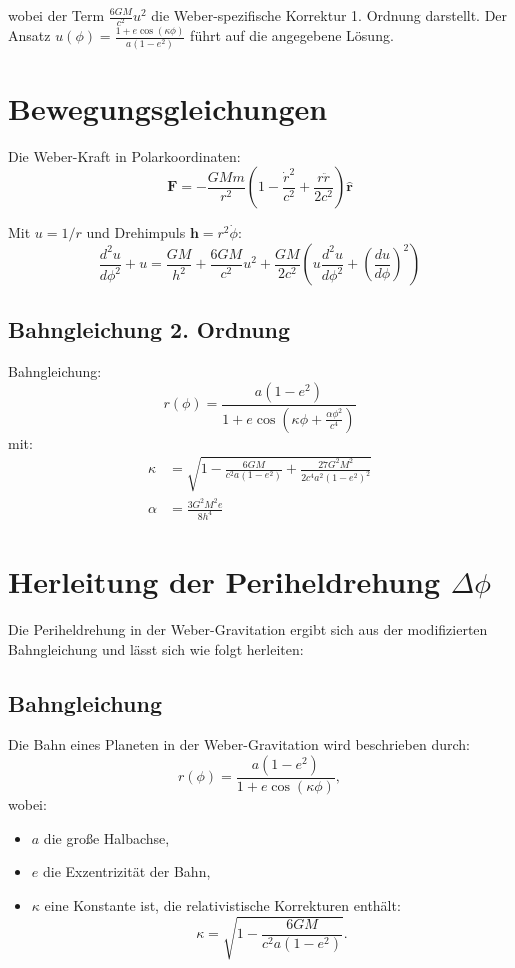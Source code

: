 wobei der Term \(\frac{6GM}{c^2} u^2\) die Weber-spezifische Korrektur 1. Ordnung darstellt. Der Ansatz \(u(\phi) = \frac{1 + e \cos(\kappa\phi)}{a(1 - e^2)}\) führt auf die angegebene Lösung.

\section{Bewegungsgleichungen}
Die Weber-Kraft in Polarkoordinaten:
\begin{equation}
\mathbf{F} = -\frac{GMm}{r^2}\left(1 - \frac{\dot{r}^2}{c^2} + \frac{r\ddot{r}}{2c^2}\right)\mathbf{\hat{r}}
\end{equation}

Mit $u=1/r$ und Drehimpuls $\mathbf{h}=r^2\dot{\phi}$:
\begin{equation}
\frac{d^2u}{d\phi^2} + u = \frac{GM}{h^2} + \frac{6GM}{c^2}u^2 + \frac{GM}{2c^2}\left(u\frac{d^2u}{d\phi^2} + \left(\frac{du}{d\phi}\right)^2\right)
\end{equation}

\subsection{Bahngleichung 2. Ordnung}
Bahngleichung:
\begin{equation}
\boxed
{
    r(\phi) = \frac{a(1-e^2)}{1 + e\cos\left(\kappa\phi + \frac{\alpha\phi^2}{c^4}\right)}
}
\end{equation}
mit:
\begin{align}
\kappa &= \sqrt{1 - \frac{6GM}{c^2a(1-e^2)} + \frac{27G^2M^2}{2c^4a^2(1-e^2)^2}}\\
\alpha &= \frac{3G^2M^2e}{8h^4}
\end{align}

\section{Herleitung der Periheldrehung $\Delta\phi$}

Die Periheldrehung in der Weber-Gravitation ergibt sich aus der modifizierten Bahngleichung und lässt sich wie folgt herleiten:

\subsection{Bahngleichung}
Die Bahn eines Planeten in der Weber-Gravitation wird beschrieben durch:
\begin{equation}
r(\phi) = \frac{a(1 - e^2)}{1 + e \cos(\kappa\phi)},
\end{equation}
wobei:
\begin{itemize}
\item $a$ die große Halbachse,
\item $e$ die Exzentrizität der Bahn,
\item $\kappa$ eine Konstante ist, die relativistische Korrekturen enthält:
\begin{equation}
\kappa = \sqrt{1 - \frac{6GM}{c^2 a(1 - e^2)}}.
\end{equation}
\end{itemize}

